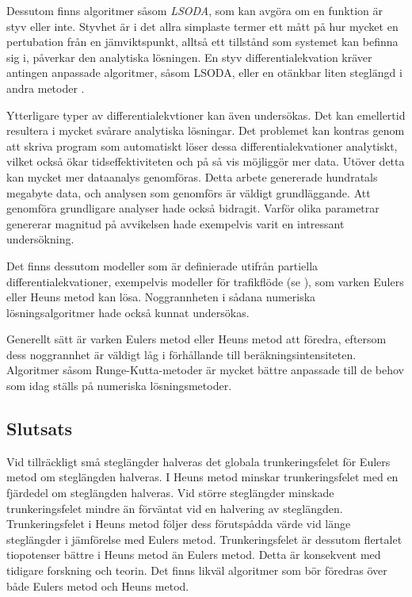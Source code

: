 Dessutom finns algoritmer såsom \emph{LSODA}, som kan avgöra om en funktion är styv eller inte. Styvhet är i det allra simplaste termer ett mått på hur mycket en pertubation från en jämviktspunkt, alltså ett tillstånd som systemet kan befinna sig i, påverkar den analytiska lösningen. En styv differentialekvation kräver antingen anpassade algoritmer, såsom LSODA, eller en otänkbar liten steglängd i andra metoder \parencite{hindmarsh_algorithms_1995}.

Ytterligare typer av differentialekvtioner kan även undersökas. Det kan emellertid resultera i mycket svårare analytiska lösningar. Det problemet kan kontras genom att skriva program som automatiskt löser dessa differentialekvationer analytiskt, vilket också ökar tidseffektiviteten och på så vis möjliggör mer data. Utöver detta kan mycket mer dataanalys genomföras. Detta arbete genererade hundratals megabyte data, och analysen som genomförs är väldigt grundläggande. Att genomföra grundligare analyser hade också bidragit. Varför olika parametrar genererar magnitud på avvikelsen hade exempelvis varit en intressant undersökning.

Det finns dessutom modeller som är definierade utifrån partiella differentialekvationer, exempelvis modeller för trafikflöde (se \cite{laval_hamiltonjacobi_2013}), som varken Eulers eller Heuns metod kan lösa. Noggrannheten i sådana numeriska lösningsalgoritmer hade också kunnat undersökas.

Generellt sätt är varken Eulers metod eller Heuns metod att föredra, eftersom dess noggrannhet är väldigt låg i förhållande till beräkningsintensiteten. Algoritmer såsom Runge-Kutta-metoder är mycket bättre anpassade till de behov som idag ställs på numeriska lösningsmetoder.

\subsection{Slutsats}
Vid tillräckligt små steglängder halveras det globala trunkeringsfelet för Eulers metod om steglängden halveras. I Heuns metod minskar trunkeringsfelet med en fjärdedel om steglängden halveras. Vid större steglängder minskade trunkeringsfelet mindre än förväntat vid en halvering av steglängden. Trunkeringsfelet i Heuns metod följer dess förutspådda värde vid länge steglängder i jämförelse med Eulers metod. Trunkeringsfelet är dessutom flertalet tiopotenser bättre i Heuns metod än Eulers metod. Detta är konsekvent med tidigare forskning och teorin. Det finns likväl algoritmer som bör föredras över både Eulers metod och Heuns metod.
